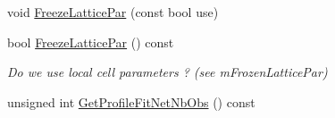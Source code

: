 \begin{DoxyCompactItemize}
void \mbox{\hyperlink{class_obj_cryst_1_1_powder_pattern_diffraction_a4476a792c880de38169424f96f482fd9}{Freeze\+Lattice\+Par}} (const bool use)
\item 
\mbox{\label{class_obj_cryst_1_1_powder_pattern_diffraction_ae4794b82bf2b5a1d444359f1ef3a9ef7}} 
bool \mbox{\hyperlink{class_obj_cryst_1_1_powder_pattern_diffraction_ae4794b82bf2b5a1d444359f1ef3a9ef7}{Freeze\+Lattice\+Par}} () const
\begin{DoxyCompactList}\small\item\em Do we use local cell parameters ? (see m\+Frozen\+Lattice\+Par) \end{DoxyCompactList}\item 
unsigned int \mbox{\hyperlink{class_obj_cryst_1_1_powder_pattern_diffraction_a0fba98457fffa0aef1d014fb2e7fcbc3}{Get\+Profile\+Fit\+Net\+Nb\+Obs}} () const
\end{DoxyCompactItemize}
